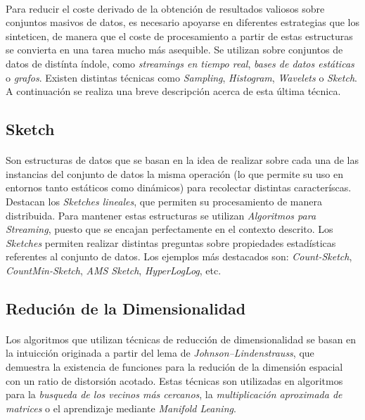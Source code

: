 \documentclass{subfiles}
\begin{document}
        \paragraph{}
        Para reducir el coste derivado de la obtención de resultados valiosos sobre conjuntos masivos de datos, es necesario apoyarse en diferentes estrategias que los sinteticen, de manera que el coste de procesamiento a partir de estas estructuras se convierta en una tarea mucho más asequible. Se utilizan sobre conjuntos de datos de distínta índole, como \emph{streamings en tiempo real}, \emph{bases de datos estáticas} o \emph{grafos}. Existen distintas técnicas como \emph{Sampling}, \emph{Histogram}, \emph{Wavelets} o \emph{Sketch}. A continuación se realiza una breve descripción acerca de esta última técnica.

        \subsection{Sketch}

          \paragraph{}
          Son estructuras de datos que se basan en la idea de realizar sobre cada una de las instancias del conjunto de datos la misma operación (lo que permite su uso en entornos tanto estáticos como dinámicos) para recolectar distintas caracteríscas. Destacan los \emph{Sketches lineales}, que permiten su procesamiento de manera distribuida. Para mantener estas estructuras se utilizan \emph{Algoritmos para Streaming}, puesto que se encajan perfectamente en el contexto descrito. Los \emph{Sketches} permiten realizar distintas preguntas sobre propiedades estadísticas referentes al conjunto de datos. Los ejemplos más destacados son: \emph{Count-Sketch}, \emph{CountMin-Sketch}, \emph{AMS Sketch}, \emph{HyperLogLog}, etc.

      \subsection{Redución de la Dimensionalidad}

        \paragraph{}
        Los algoritmos que utilizan técnicas de reducción de dimensionalidad se basan en la intuicción originada a partir del lema de \emph{Johnson–Lindenstrauss}, que demuestra la existencia de funciones para la redución de la dimensión espacial con un ratio de distorsión acotado. Estas técnicas son utilizadas en algoritmos para la \emph{busqueda de los vecinos más cercanos}, la \emph{multiplicación aproximada de matrices} o el aprendizaje mediante \emph{Manifold Leaning}.
\end{document}
